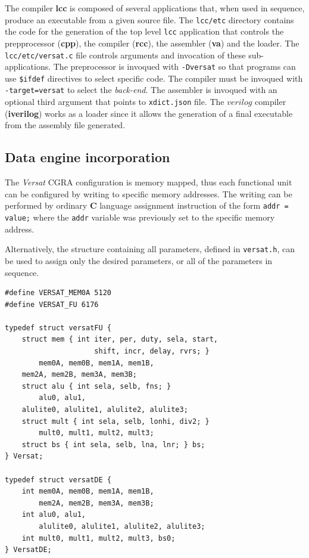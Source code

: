 \documentclass[journal]{IEEEtran}
\begin{document}
The compiler {\bf lcc} is composed of several applications
that, when used in sequence, produce an executable from
a given source file.
The {\tt lcc/etc} directory contains the code for the
generation of the top level {\tt lcc} application that
controls the prepprocessor ({\bf cpp}), the compiler
({\bf rcc}),  the assembler ({\bf va}) and the loader.
The {\tt lcc/etc/versat.c} file controls arguments and
invocation of these sub-applications.
The preprocessor is invoqued with \verb|-Dversat| so that
programs can use \verb|$ifdef| directives to select
specific code.
The compiler must be invoqued with \verb|-target=versat|
to select the {\it back-end}.
The assembler is invoqued with an optional third argument
that points to \verb|xdict.json| file.
The $verilog$ compiler ({\bf iverilog}) works as a loader
since it allows the generation of a final executable from the
assembly file generated.

\subsection{Data engine incorporation}

The {\it Versat} {\sc CGRA} configuration is memory mapped,
thus each functional unit can be configured by writing to
specific memory addresses.
The writing can be performed by ordinary {\bf C} language
assignment instruction of the form {\tt *addr = value;}
where the {\tt addr} variable was previously set to the
specific memory address.

Alternatively, the structure containing all parameters, defined in
{\tt versat.h}, can be used to assign only the desired parameters,
or all of the parameters in sequence.
{\footnotesize
\begin{verbatim}
#define VERSAT_MEM0A 5120
#define VERSAT_FU 6176

typedef struct versatFU {
    struct mem { int iter, per, duty, sela, start,
                     shift, incr, delay, rvrs; }
        mem0A, mem0B, mem1A, mem1B,
	mem2A, mem2B, mem3A, mem3B;
    struct alu { int sela, selb, fns; }
        alu0, alu1,
	alulite0, alulite1, alulite2, alulite3;
    struct mult { int sela, selb, lonhi, div2; }
        mult0, mult1, mult2, mult3;
    struct bs { int sela, selb, lna, lnr; } bs;
} Versat;

typedef struct versatDE {
    int mem0A, mem0B, mem1A, mem1B,
        mem2A, mem2B, mem3A, mem3B;
    int alu0, alu1,
        alulite0, alulite1, alulite2, alulite3;
    int mult0, mult1, mult2, mult3, bs0;
} VersatDE;
\end{verbatim}
}
\end{document}
